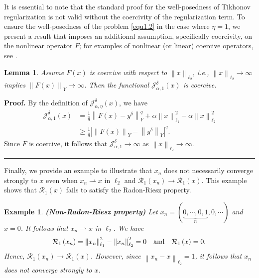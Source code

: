 \documentclass[a4paper,12pt]{article}
\newtheorem{lemma}[theorem]{Lemma}
\newtheorem{example}[theorem]{Example}
\numberwithin{equation}{section}
\newenvironment{proof}[1][Proof]{\textbf{#1.} }
{\ \rule{0.75em}{0.75em}\smallskip}
\begin{document}
\par It is essential to note that the standard proof for the well-posedness of Tikhonov regularization is not valid without the coercivity of the regularization term. To ensure the well-posedness of the problem \eqref{equ1.2} in the case where $\eta=1$, we present a result that imposes an additional assumption, specifically coercivity, on the nonlinear operator $F$; for examples of nonlinear (or linear) coercive operators, see \cite{AZ00, IK13}.

\begin{lemma}\label{lem2.10}
    Assume $F\left(x\right)$ is coercive with respect to $\left\|x\right\|_{\ell_{2}}$, i.e., $\left\|x\right\|_{\ell_{2}}\rightarrow\infty$ implies $\left\|F\left(x\right) \right\|_{Y}\rightarrow\infty$. Then the functional $\mathcal{J}_{\alpha,1}^{\delta}\left(x\right)$ is coercive.
\end{lemma}

\begin{proof}
    By the definition of $\mathcal{J}_{\alpha,\eta}^{\delta}\left(x\right)$, we have
    \begin{align*}
        \mathcal{J}_{\alpha,1}^{\delta}\left(x\right)
        & =\frac{1}{q}\left\|F\left(x\right)- y^{\delta}\right\|_{Y}^{q}+\alpha\left\|x\right\|_{\ell_{1}}^{2}- \alpha\left\|x\right\|_{\ell_{2}}^{2} \\
        & \geq \frac{1}{q}\left|\left\|F\left(x\right)\right\|_{Y}-\left\|y^{\delta}\right\|_{Y} \right|^{q}.
    \end{align*}
    Since $F$ is coercive, it follows that $\mathcal{J}_{\alpha,1}^{\delta}\rightarrow \infty$ as $\left\|x\right\|_{\ell_{2}}\rightarrow\infty$.
\end{proof}

\par Finally, we provide an example to illustrate that $x_{n}$ does not necessarily converge strongly to $x$ even when $x_{n}\rightharpoonup x$ in $\ell_{2}$ and $\mathcal{R}_{1}\left(x_{n}\right)\rightarrow\mathcal{R}_{1}\left(x\right)$. This example shows that $\mathcal{R}_{1}\left(x\right)$ fails to satisfy the Radon-Riesz property.

\begin{example}\label{exa2.11}
    \textbf{(Non-Radon-Riesz property)} Let $x_{n}=(\underbrace{0,\cdots,0,1}_{n},0,\cdots)$ and $x=0$. It follows that $x_{n}\rightharpoonup x$ in $\ell_{2}$. We have
    \begin{equation*}
        \mathcal{R}_{1}\left(x_{n}\right)=\left\|x_{n}\right\|_{\ell_{1}}^{2}- \left\|x_{n}\right\|_{\ell_{2}}^{2}=0 \quad {\rm and} \quad \mathcal{R}_{1}\left(x\right)=0.
    \end{equation*}
    Hence, $\mathcal{R}_{1}\left(x_{n}\right)\rightarrow \mathcal{R}_{1}\left(x\right)$. However, since $\left\|x_{n}-x\right\|_{\ell_{2}}=1$,  it follows that $x_{n}$ does not converge strongly to $x$.
\end{example}
\end{document}
